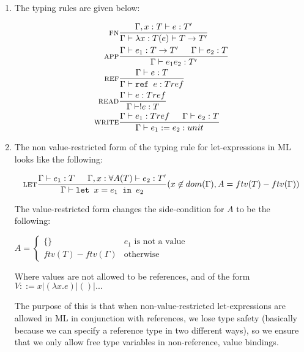


\begin{enumerate}[label=(\alph*)]
    \item
        The typing rules are given below:

        \begin{align*}
            \textsc{fn}&\frac{\Gamma, x : T \vdash e : T'}{\Gamma \vdash \lambda x:T (e) \vdash T \rightarrow T'}\\
            \textsc{app}&\frac{\Gamma \vdash e_1 : T \rightarrow T' \hspace{15pt} \Gamma \vdash e_2 : T}{\Gamma \vdash e_1 e_2 : T'}\\
            \textsc{ref}&\frac{\Gamma \vdash e : T}{\Gamma \vdash \texttt{ref }e : T ref}\\
            \textsc{read}&\frac{\Gamma \vdash e : T ref}{\Gamma \vdash !e : T}\\
            \textsc{write}&\frac{\Gamma \vdash e_1 : T ref \hspace{15pt} \Gamma \vdash e_2 : T}{\Gamma \vdash e_1 := e_2 : unit}\\
        \end{align*}

    \item
        The non value-restricted form of the typing rule for let-expressions in ML looks like the following:

        \[
            \textsc{let}\frac{\Gamma \vdash e_1 : T \hspace{15pt} \Gamma, x : \forall A(T) \vdash e_2 : T'}{\Gamma \vdash \texttt{let }x = e_1\texttt{ in }e_2}(x \not \in dom(\Gamma), A = ftv(T) - ftv(\Gamma))
        \] 

        The value-restricted form changes the side-condition for $A$ to be the following:

        $A = \begin{cases}\{\} & \text{$e_1$ is not a value}\\ftv(T) - ftv(\Gamma) & \text{otherwise}\end{cases}$

        Where values are not allowed to be references, and of the form $V ::= x | (\lambda x.e) | () | ...$

        The purpose of this is that when non-value-restricted let-expressions are allowed in ML in  conjunction with references, we lose type safety (basically because we can specify a reference type in two different ways), so we ensure that we only allow free type variables in non-reference, value bindings.


\end{enumerate}

